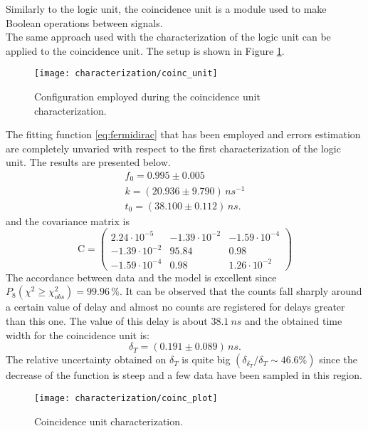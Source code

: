 
Similarly to the logic unit, the coincidence unit is a module used to make Boolean operations between signals.\\

The same approach used with the characterization of the logic unit can be applied to the coincidence unit. The setup is shown in Figure \ref{coinc_unit}.\\
\medskip
\medskip
\begin{figure}[!h]
	\centering
	\texttt{[image: characterization/coinc\_unit]}
	\caption{Configuration employed during the coincidence unit characterization.}
	\label{coinc_unit}
\end{figure}
\medskip
\medskip
The fitting function \eqref{eq:fermidirac} that has been employed and errors estimation are completely unvaried with respect to the first characterization of the logic unit. The results are presented below.\\
\medskip
\medskip
\begin{equation}
\begin{array}{l}
f_0 = 0.995 \pm 0.005\\
k = ( 20.936 \pm 9.790 ) \,  \si{ns^{-1}} \\
t_0 = ( 38.100 \pm 0.112 ) \,  \si{ns} .
\end{array}
\end{equation}
\medskip
\medskip
and the covariance matrix is
\begin{equation}
\textrm{C}=\left(
\begin{array}{ccc}
     2.24 \cdot 10^{-5}  &  -1.39\cdot 10^{-2} &  -1.59 \cdot 10^{-4} \\
    -1.39 \cdot 10^{-2} &      95.84  &      0.98\\
    -1.59\cdot 10^{-4}  &       0.98   &    1.26\cdot 10^{-2} 
\end{array}
\right)
\end{equation}
The accordance between data and the model is excellent since $P_8\left(\chi^2\geq\chi_{obs}^2\right)=99.96\,\%$.
It can be observed that  the counts fall sharply around a certain value of delay and almost no counts are registered for delays greater than this one.  
The value of this delay is about $\SI{38.1}{ns}$ and the obtained time width for the coincidence unit is: 
\begin{equation}
\delta_T = ( 0.191\pm 0.089 ) \, \si{ns}.
\end{equation}
The relative uncertainty obtained on $\delta_T$ is quite big $\left( \delta_{\delta_T} / \delta_T \sim 46.6 \%\right)$ since the decrease of the function is steep and a few data have been sampled in this region.\\

\begin{figure}[!h]
	\centering
	\texttt{[image: characterization/coinc\_plot]}
	\caption{Coincidence unit characterization.}
	\label{coinc_plot}
\end{figure}

